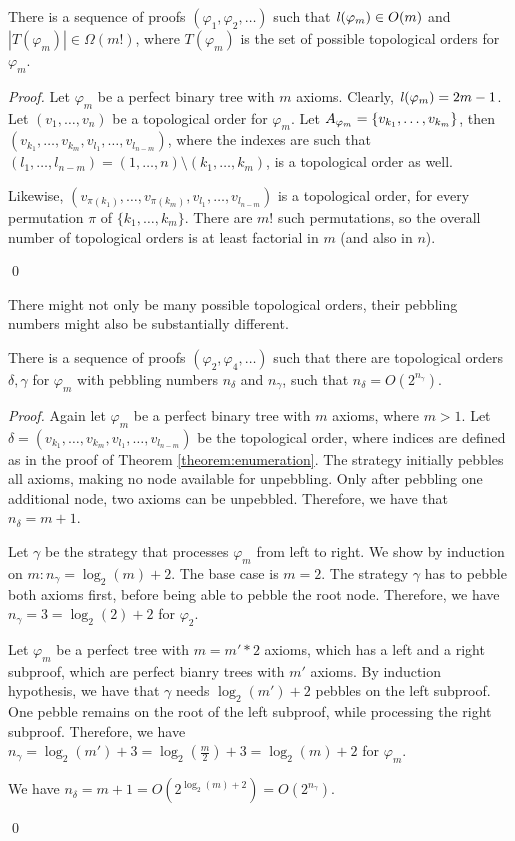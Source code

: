 \begin{theorem}
\label{theorem:enumeration}
There is a sequence of proofs $(\varphi_1,\varphi_2,\ldots)$ such that $\mathit{l}(\varphi_m) \in O(m)$ and $|T(\varphi_m)| \in \Omega(m!)$, where $T(\varphi_m)$ is the set of possible topological orders for $\varphi_m$.
\end{theorem}
\begin{proof}
Let $\varphi_m$ be a perfect binary tree with $m$ axioms. Clearly, $\mathit{l}(\varphi_m) = 2m-1$.
Let $(v_1,\ldots,v_n)$ be a topological order for $\varphi_m$. 
Let $A_{\varphi_m} = \{v_{k_1},\ldots,v_{k_m}\}$, then $(v_{k_1},\ldots,v_{k_m},v_{l_1},\ldots,v_{l_{n-m}})$, 
where the indexes are such that $(l_1,\ldots,l_{n-m}) = (1,\ldots,n) \setminus (k_1,\ldots,k_m)$, is a topological order as well. 

Likewise, $(v_{\pi({k_1})},\ldots,v_{\pi({k_m})},v_{l_1},\ldots,v_{l_{n-m}})$ is a topological order, for every permutation $\pi$ of $\{k_1,\ldots,k_m\}$. There are $m!$ such permutations, so the overall number of topological orders is at least factorial in $m$ (and also in $n$).

\noindent\qed
\end{proof}

There might not only be many possible topological orders, their pebbling numbers might also be substantially different.

\begin{theorem}
\label{theorem:enumeration}
There is a sequence of proofs $(\varphi_2,\varphi_4,\ldots)$ such that there are topological orders $\delta, \gamma$ for $\varphi_m$ with pebbling numbers $n_\delta$ and $n_\gamma$, such that $n_\delta = O(2^{n_\gamma})$.
\end{theorem}
\begin{proof}
Again let $\varphi_m$ be a perfect binary tree with $m$ axioms, where $m > 1$.
Let $\delta = (v_{k_1},\ldots,v_{k_m},v_{l_1},\ldots,v_{l_{n-m}})$ be the topological order, where indices are defined as in the proof of Theorem \ref{theorem:enumeration}.
The strategy initially pebbles all axioms, making no node available for unpebbling.
Only after pebbling one additional node, two axioms can be unpebbled.
Therefore, we have that $n_\delta = m + 1$.

Let $\gamma$ be the strategy that processes $\varphi_m$ from left to right.
We show by induction on $m: n_\gamma = \log_2(m)+2$.
The base case is $m = 2$.
The strategy $\gamma$ has to pebble both axioms first, before being able to pebble the root node.
Therefore, we have $n_\gamma = 3 = \log_2(2) + 2$ for $\varphi_2$.

Let $\varphi_m$ be a perfect tree with $m=m'*2$ axioms, which has a left and a right subproof, which are perfect bianry trees with $m'$ axioms.
By induction hypothesis, we have that $\gamma$ needs $\log_2(m') + 2$ pebbles on the left subproof.
One pebble remains on the root of the left subproof, while processing the right subproof.
Therefore, we have $n_\gamma = \log_2(m') + 3 = \log_2(\frac{m}{2}) + 3 = \log_2(m) + 2$ for $\varphi_m$.

We have $n_\delta = m + 1 = O(2^{\log_2(m)+2}) = O(2^{n_\gamma})$.

\noindent\qed
\end{proof}